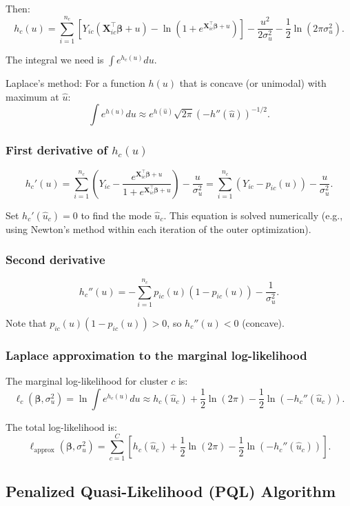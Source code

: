 \documentclass[12pt]{article}
\numberwithin{equation}{section}
\begin{document}
	Then:
	\[
	h_c(u) = \sum_{i=1}^{n_c} \left[ Y_{ic} (\mathbf{X}_{ic}^\top \boldsymbol{\beta} + u) - \ln\left(1 + e^{\mathbf{X}_{ic}^\top \boldsymbol{\beta} + u}\right) \right] - \frac{u^2}{2\sigma_u^2} - \frac{1}{2}\ln(2\pi\sigma_u^2).
	\]
	
	The integral we need is $\int e^{h_c(u)} du$.
	
	Laplace's method: For a function $h(u)$ that is concave (or unimodal) with maximum at $\hat{u}$:
	\[
	\int e^{h(u)} du \approx e^{h(\hat{u})} \sqrt{2\pi} \left( -h''(\hat{u}) \right)^{-1/2}.
	\]
	
	\subsubsection{First derivative of $h_c(u)$}
	\[
	h_c'(u) = \sum_{i=1}^{n_c} \left( Y_{ic} - \frac{e^{\mathbf{X}_{ic}^\top \boldsymbol{\beta} + u}}{1 + e^{\mathbf{X}_{ic}^\top \boldsymbol{\beta} + u}} \right) - \frac{u}{\sigma_u^2} = \sum_{i=1}^{n_c} (Y_{ic} - p_{ic}(u)) - \frac{u}{\sigma_u^2}.
	\]
	
	Set $h_c'(\hat{u}_c) = 0$ to find the mode $\hat{u}_c$. This equation is solved numerically (e.g., using Newton's method within each iteration of the outer optimization).
	
	\subsubsection{Second derivative}
	\[
	h_c''(u) = -\sum_{i=1}^{n_c} p_{ic}(u)(1-p_{ic}(u)) - \frac{1}{\sigma_u^2}.
	\]
	
	Note that $p_{ic}(u)(1-p_{ic}(u)) > 0$, so $h_c''(u) < 0$ (concave).
	
	\subsubsection{Laplace approximation to the marginal log-likelihood}
	
	The marginal log-likelihood for cluster $c$ is:
	\[
	\ell_c(\boldsymbol{\beta}, \sigma_u^2) = \ln \int e^{h_c(u)} du \approx h_c(\hat{u}_c) + \frac{1}{2} \ln(2\pi) - \frac{1}{2} \ln\left(-h_c''(\hat{u}_c)\right).
	\]
	
	The total log-likelihood is:
	\[
	\ell_{\text{approx}}(\boldsymbol{\beta}, \sigma_u^2) = \sum_{c=1}^C \left[ h_c(\hat{u}_c) + \frac{1}{2} \ln(2\pi) - \frac{1}{2} \ln\left(-h_c''(\hat{u}_c)\right) \right].
	\]
	
	\subsection{Penalized Quasi-Likelihood (PQL) Algorithm}
	
\end{document}
